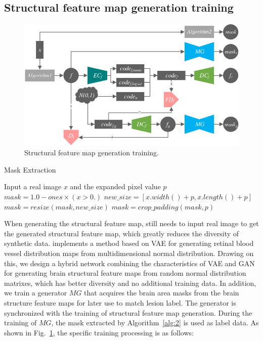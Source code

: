 \documentclass{ecai}
\begin{document}
\subsection{Structural feature map generation training}
\begin{figure}
	\centering
	\includegraphics[width=1.0\columnwidth]{figures/feature_train}
	\caption{Structural feature map generation training.}
	\label{feature_train}
\end{figure}
\begin{algorithm}
	\caption{Mask Extraction}
	\label{alg:2}
	\begin{algorithmic}[1]
		\State Input a real image $x$ and the expanded pixel value $p$
		\State $mask = 1.0 - ones \times (x > 0.)$
		\State $new\_size=[x.width() + p, x.length() + p]$
		\State $mask = resize(mask, new\_size)$
		\State $mask = crop\_padding(mask,p)$
	\end{algorithmic}  
\end{algorithm}
When generating the structural feature map, \cite{4shin2018medical} still needs to input real image to get the generated structural feature map, which greatly reduces the diversity of synthetic data. \cite{41costa2017towards} implements a method based on VAE for generating retinal blood vessel distribution maps from multidimensional normal distribution. Drawing on this, we design a hybrid network combining the characteristics of VAE and GAN for generating brain structural feature maps from random normal distribution matrixes, which has better diversity and no additional training data. In addition, we train a generator $MG$ that acquires the brain area masks from the brain structure feature maps for later use to match lesion label. The generator is synchronized with the training of structural feature map generation. During the training of $MG$, the mask extracted by Algorithm~\ref{alg:2} is used as label data. As shown in Fig.~\ref{feature_train}, the specific training processing is as follows:
\end{document}
